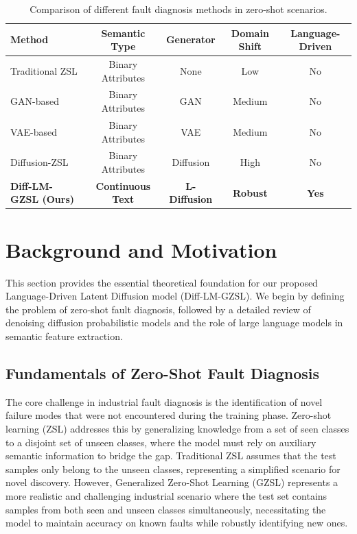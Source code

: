 \documentclass[journal]{IEEEtran}
\begin{document}
\begin{table}[htbp]
\caption{Comparison of different fault diagnosis methods in zero-shot scenarios.}
\label{tab:comparison}
\centering
\begin{tabular}{lcccc}
\toprule
Method & Semantic Type & Generator & Domain Shift & Language-Driven \\ \midrule
Traditional ZSL \cite{Wang2021a} & Binary Attributes & None & Low & No \\
GAN-based \cite{Yan2021} & Binary Attributes & GAN & Medium & No \\
VAE-based \cite{Xu2021} & Binary Attributes & VAE & Medium & No \\
Diffusion-ZSL \cite{Mao2024} & Binary Attributes & Diffusion & High & No \\
\textbf{Diff-LM-GZSL (Ours)} & \textbf{Continuous Text} & \textbf{L-Diffusion} & \textbf{Robust} & \textbf{Yes} \\ \bottomrule
\end{tabular}
\end{table}

\section{Background and Motivation}
\label{sec:background}

This section provides the essential theoretical foundation for our proposed Language-Driven Latent Diffusion model (Diff-LM-GZSL). We begin by defining the problem of zero-shot fault diagnosis, followed by a detailed review of denoising diffusion probabilistic models and the role of large language models in semantic feature extraction.

\subsection{Fundamentals of Zero-Shot Fault Diagnosis}
\label{subsec:zsl_fundamentals}

The core challenge in industrial fault diagnosis is the identification of novel failure modes that were not encountered during the training phase. Zero-shot learning (ZSL) addresses this by generalizing knowledge from a set of seen classes to a disjoint set of unseen classes, where the model must rely on auxiliary semantic information to bridge the gap. Traditional ZSL assumes that the test samples only belong to the unseen classes, representing a simplified scenario for novel discovery. However, Generalized Zero-Shot Learning (GZSL) represents a more realistic and challenging industrial scenario where the test set contains samples from both seen and unseen classes simultaneously, necessitating the model to maintain accuracy on known faults while robustly identifying new ones.
\end{document}
